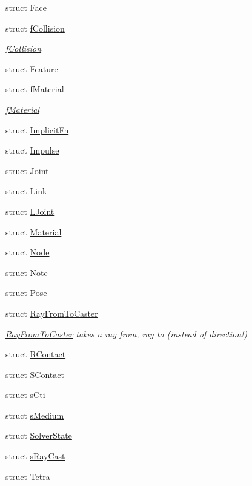 \begin{DoxyCompactItemize}
struct \hyperlink{structbtSoftBody_1_1Face}{Face}
\item 
struct \hyperlink{structbtSoftBody_1_1fCollision}{f\+Collision}
\begin{DoxyCompactList}\small\item\em \hyperlink{structbtSoftBody_1_1fCollision}{f\+Collision} \end{DoxyCompactList}\item 
struct \hyperlink{structbtSoftBody_1_1Feature}{Feature}
\item 
struct \hyperlink{structbtSoftBody_1_1fMaterial}{f\+Material}
\begin{DoxyCompactList}\small\item\em \hyperlink{structbtSoftBody_1_1fMaterial}{f\+Material} \end{DoxyCompactList}\item 
struct \hyperlink{structbtSoftBody_1_1ImplicitFn}{Implicit\+Fn}
\item 
struct \hyperlink{structbtSoftBody_1_1Impulse}{Impulse}
\item 
struct \hyperlink{structbtSoftBody_1_1Joint}{Joint}
\item 
struct \hyperlink{structbtSoftBody_1_1Link}{Link}
\item 
struct \hyperlink{structbtSoftBody_1_1LJoint}{L\+Joint}
\item 
struct \hyperlink{structbtSoftBody_1_1Material}{Material}
\item 
struct \hyperlink{structbtSoftBody_1_1Node}{Node}
\item 
struct \hyperlink{structbtSoftBody_1_1Note}{Note}
\item 
struct \hyperlink{structbtSoftBody_1_1Pose}{Pose}
\item 
struct \hyperlink{structbtSoftBody_1_1RayFromToCaster}{Ray\+From\+To\+Caster}
\begin{DoxyCompactList}\small\item\em \hyperlink{structbtSoftBody_1_1RayFromToCaster}{Ray\+From\+To\+Caster} takes a ray from, ray to (instead of direction!) \end{DoxyCompactList}\item 
struct \hyperlink{structbtSoftBody_1_1RContact}{R\+Contact}
\item 
struct \hyperlink{structbtSoftBody_1_1SContact}{S\+Contact}
\item 
struct \hyperlink{structbtSoftBody_1_1sCti}{s\+Cti}
\item 
struct \hyperlink{structbtSoftBody_1_1sMedium}{s\+Medium}
\item 
struct \hyperlink{structbtSoftBody_1_1SolverState}{Solver\+State}
\item 
struct \hyperlink{structbtSoftBody_1_1sRayCast}{s\+Ray\+Cast}
\item 
struct \hyperlink{structbtSoftBody_1_1Tetra}{Tetra}
\end{DoxyCompactItemize}

